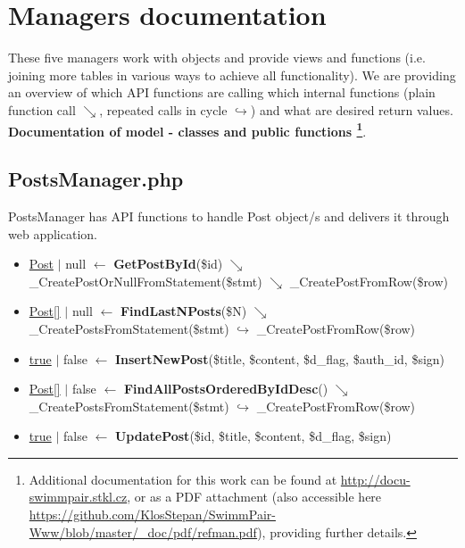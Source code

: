 \section{Managers documentation}
\par These five managers work with objects and provide views and functions (i.e. joining more tables in various ways to achieve all functionality). We are providing an overview of which API functions are calling which internal functions (plain function call $\searrow$, repeated calls in cycle $\hookrightarrow$) and what are desired return values.  
\newline
\textbf{Documentation of model - classes and public functions \footnote{Additional documentation for this work can be found at \url{http://docu-swimmpair.stkl.cz}, or as a PDF attachment (also accessible here \url{https://github.com/KlosStepan/SwimmPair-Www/blob/master/_doc/pdf/refman.pdf}), providing further details.}}.

\subsection{PostsManager.php}
PostsManager has API functions to handle Post object/s and delivers it through web application.
\begin{itemize}
  \setlength\itemsep{0em}
  \item \underline{Post} $\vert$ null $\leftarrow$ \textbf{GetPostById}(\$id)
  \newline    $\searrow$ \_CreatePostOrNullFromStatement(\$stmt)
  \newline    $\searrow$ \_CreatePostFromRow(\$row)
  \item \underline{Post[]} $\vert$ null $\leftarrow$ \textbf{FindLastNPosts}(\$N)
  \newline    $\searrow$ \_CreatePostsFromStatement(\$stmt)
  \newline    $\hookrightarrow$ \_CreatePostFromRow(\$row)
  \item \underline{true} $\vert$ false $\leftarrow$ \textbf{InsertNewPost}(\$title, \$content, \$d\_flag, \$auth\_id, \$sign)
  \item \underline{Post[]} $\vert$ false $\leftarrow$ \textbf{FindAllPostsOrderedByIdDesc}()
  \newline    $\searrow$ \_CreatePostsFromStatement(\$stmt)
  \newline    $\hookrightarrow$ \_CreatePostFromRow(\$row)
  \item \underline{true} $\vert$ false $\leftarrow$ \textbf{UpdatePost}(\$id, \$title, \$content, \$d\_flag, \$sign)
\end{itemize}

